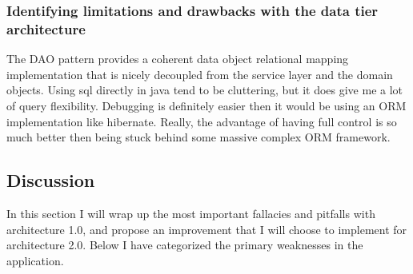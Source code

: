 		\subsubsection{Identifying limitations and drawbacks with the data tier architecture}
		The DAO pattern provides a coherent data object relational mapping implementation that is nicely decoupled from the service layer and the domain objects. Using sql directly in java tend to be cluttering, but it does give me a lot of query flexibility. Debugging is definitely easier then it would be using an ORM implementation like hibernate. Really, the advantage of having full control is so much better then being stuck behind some massive complex ORM framework. 
	
		\subsection{Discussion}
		In this section I will wrap up the most important fallacies and pitfalls with architecture 1.0, and propose an improvement that I will choose to implement for architecture 2.0. Below I have categorized the primary weaknesses in the application.
		
